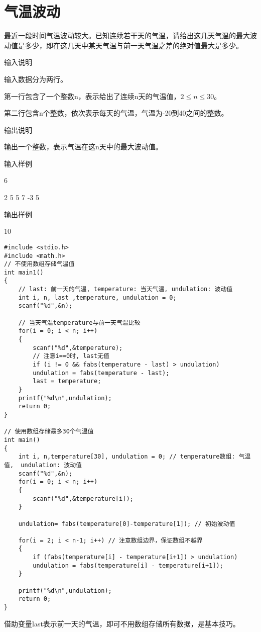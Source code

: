 \section{气温波动}	
最近一段时间气温波动较大。已知连续若干天的气温，请给出这几天气温的最大波动值是多少，即在这几天中某天气温与前一天气温之差的绝对值最大是多少。

输入说明	

输入数据分为两行。

第一行包含了一个整数n，表示给出了连续n天的气温值，$2\le n\le 30$。

第二行包含n个整数，依次表示每天的气温，气温为-20到40之间的整数。

输出说明
	
输出一个整数，表示气温在这n天中的最大波动值。

输入样例	

6

2 5 5 7 -3 5

输出样例
	
10

\begin{lstlisting}
#include <stdio.h>
#include <math.h>
// 不使用数组存储气温值
int main1()
{
	// last: 前一天的气温, temperature: 当天气温, undulation: 波动值 
	int i, n, last ,temperature, undulation = 0;
	scanf("%d",&n);
	
	// 当天气温temperature与前一天气温比较
	for(i = 0; i < n; i++)
	{
		scanf("%d",&temperature);
		// 注意i==0时, last无值
		if (i != 0 && fabs(temperature - last) > undulation) 
		undulation = fabs(temperature - last);
		last = temperature;
	} 
	printf("%d\n",undulation); 
	return 0;
} 

// 使用数组存储最多30个气温值 
int main()
{
	int i, n,temperature[30], undulation = 0; // temperature数组: 气温值,  undulation: 波动值 
	scanf("%d",&n);
	for(i = 0; i < n; i++)
	{
		scanf("%d",&temperature[i]);
	} 
	
	undulation= fabs(temperature[0]-temperature[1]); // 初始波动值
	
	for(i = 2; i < n-1; i++) // 注意数组边界，保证数组不越界 
	{
		if (fabs(temperature[i] - temperature[i+1]) > undulation) 
		undulation = fabs(temperature[i] - temperature[i+1]);
	} 
	
	printf("%d\n",undulation); 
	return 0;
} 
\end{lstlisting}

\begin{note}
	借助变量last表示前一天的气温，即可不用数组存储所有数据，是基本技巧。
\end{note}
	


